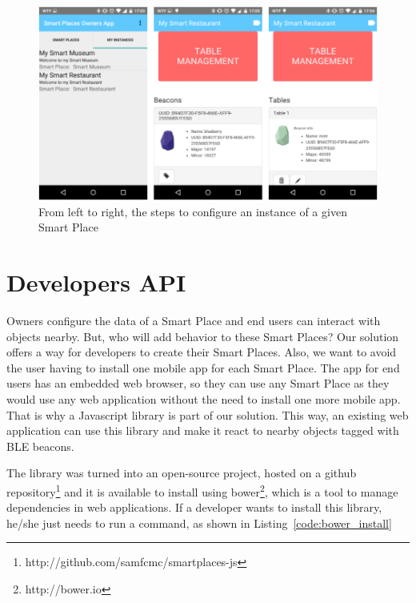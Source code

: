 \begin{figure}[!ht]
  \centering
    \includegraphics[width=1\textwidth, keepaspectratio]{images/screenshots/ownersapp_configure}
    \caption[Configure a Smart Place Instance]{From left to right, the steps to configure an instance of a given Smart Place}
    \label{fig:screenshot_ownersapp_configure}
\end{figure}

\section{Developers API}
\label{sec:solution_developers_api}
Owners configure the data of a Smart Place and end users can interact with objects nearby.
But, who will add behavior to these Smart Places?
Our solution offers a way for developers to create their Smart Places.
Also, we want to avoid the user having to install one mobile app for each Smart Place.
The app for end users has an embedded web browser, so they can use any Smart Place as they would use any web application without the need to install one more mobile app.
That is why a Javascript library is part of our solution.
This way, an existing web application can use this library and make it react to nearby objects tagged with \gls{BLE} beacons.

The library was turned into an open-source project, hosted on a github repository\footnote{http://github.com/samfcmc/smartplaces-js} and it is available to install using bower\footnote{http://bower.io}, which is a tool to manage dependencies in web applications.
If a developer wants to install this library, he/she just needs to run a command, as shown in Listing~\ref{code:bower_install}

